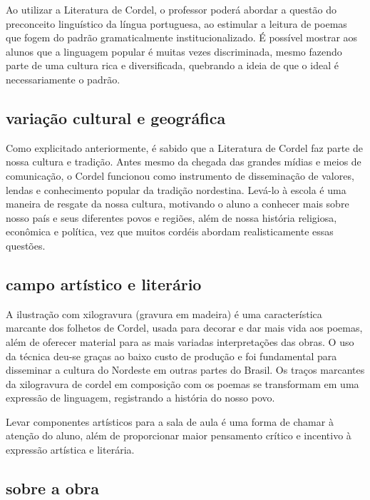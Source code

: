 \documentclass[12pt]{extarticle}
\begin{document}
Ao utilizar a Literatura de Cordel, o professor poderá abordar a questão
do preconceito linguístico da língua portuguesa, ao estimular a leitura
de poemas que fogem do padrão gramaticalmente institucionalizado. É
possível mostrar aos alunos que a linguagem popular é muitas vezes
discriminada, mesmo fazendo parte de uma cultura rica e diversificada,
quebrando a ideia de que o ideal é necessariamente o padrão.

\subsection{variação cultural e geográfica}

Como explicitado anteriormente, é sabido que a Literatura de Cordel faz
parte de nossa cultura e tradição. Antes mesmo da chegada das grandes
mídias e meios de comunicação, o Cordel funcionou como instrumento de
disseminação de valores, lendas e conhecimento popular da tradição
nordestina. Levá-lo à escola é uma maneira de resgate da nossa cultura,
motivando o aluno a conhecer mais sobre nosso país e seus diferentes
povos e regiões, além de nossa história religiosa, econômica e política,
vez que muitos cordéis abordam realisticamente essas questões.

\subsection{campo artístico e literário}

A ilustração com xilogravura (gravura em madeira) é uma característica
marcante dos folhetos de Cordel, usada para decorar e dar mais vida aos
poemas, além de oferecer material para as mais variadas interpretações
das obras. O uso da técnica deu-se graças ao baixo custo de produção e
foi fundamental para disseminar a cultura do Nordeste em outras partes
do Brasil. Os traços marcantes da xilogravura de cordel em composição
com os poemas se transformam em uma expressão de linguagem, registrando
a história do nosso povo.

Levar componentes artísticos para a sala de aula é uma forma de chamar à
atenção do aluno, além de proporcionar maior pensamento crítico e
incentivo à expressão artística e literária.


\subsection{sobre a obra }
\end{document}
